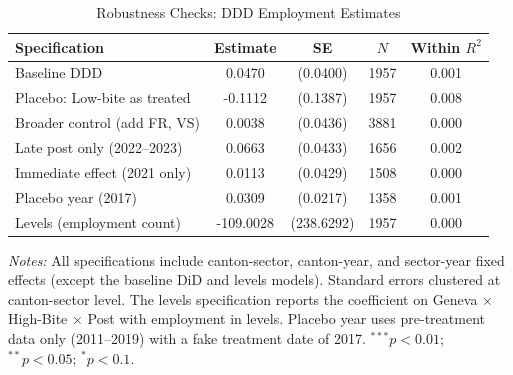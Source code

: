 \begin{table}[htbp]
\centering
\caption{Robustness Checks: DDD Employment Estimates}
\label{tab:robustness}
\begin{threeparttable}
\begin{tabular}{lcccc}
\toprule
Specification & Estimate & SE & $N$ & Within $R^2$ \\
\midrule
Baseline DDD & 0.0470 & (0.0400) & 1957 & 0.001 \\
Placebo: Low-bite as treated & -0.1112 & (0.1387) & 1957 & 0.008 \\
Broader control (add FR, VS) & 0.0038 & (0.0436) & 3881 & 0.000 \\
Late post only (2022--2023) & 0.0663 & (0.0433) & 1656 & 0.002 \\
Immediate effect (2021 only) & 0.0113 & (0.0429) & 1508 & 0.000 \\
Placebo year (2017) & 0.0309 & (0.0217) & 1358 & 0.001 \\
Levels (employment count) & -109.0028 & (238.6292) & 1957 & 0.000 \\
\bottomrule
\end{tabular}
\begin{tablenotes}[flushleft]
\small
\item \textit{Notes:} All specifications include canton-sector, canton-year, and
sector-year fixed effects (except the baseline DiD and levels models). Standard errors
clustered at canton-sector level. The levels specification reports the coefficient on
Geneva $\times$ High-Bite $\times$ Post with employment in levels. Placebo year uses
pre-treatment data only (2011--2019) with a fake treatment date of 2017.
$^{***}p<0.01$; $^{**}p<0.05$; $^{*}p<0.1$.
\end{tablenotes}
\end{threeparttable}
\end{table}
